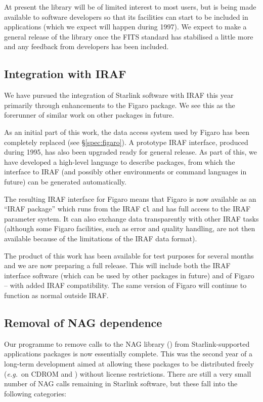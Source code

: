 At present the library will be of limited interest to most users, but
is being made available to software developers so that its facilities
can start to be included in applications (which we expect will happen
during 1997). We expect to make a general release of the library once
the FITS standard has stabilised a little more and any feedback from
developers has been included.

\subsection{\label{infra:IRAF}Integration with IRAF}

We have pursued the integration of Starlink software with IRAF this
year primarily through enhancements to the Figaro package. We see this
as the forerunner of similar work on other packages in future.

As an initial part of this work, the data access system used by Figaro
has been completely replaced (see \S\ref{spec:figaro}). A prototype
IRAF interface, produced during 1995, has also been upgraded ready for
general release. As part of this, we have developed a high-level
language to describe packages, from which the interface to IRAF (and
possibly other environments or command languages in future) can be
generated automatically.

The resulting IRAF interface for Figaro means that Figaro is now
available as an ``IRAF package'' which runs from the IRAF {\tt cl} and
has full access to the IRAF parameter system. It can also exchange
data transparently with other IRAF tasks (although some Figaro
facilities, such as error and quality handling, are not then available
because of the limitations of the IRAF data format).

The product of this work has been available for test purposes for
several months and we are now preparing a full release. This will
include both the IRAF interface software (which can be used by other
packages in future) and of Figaro -- with added IRAF
compatibility. The same version of Figaro will continue to function as
normal outside IRAF.

\subsection{Removal of NAG dependence}

Our programme to remove calls to the NAG library
() from Starlink-supported applications packages
is now essentially complete. This was the second year of a long-term
development aimed at allowing these packages to be distributed freely
({\em e.g.}\ on CDROM and ) without license
restrictions. There are still a very small number of NAG calls
remaining in Starlink software, but these fall into the following
categories:

